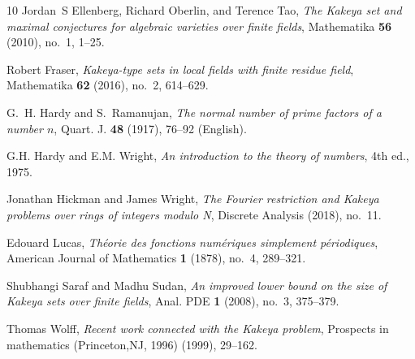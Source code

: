 \documentclass{aic}
\begin{document}
\begin{thebibliography}{10}
Jordan~S Ellenberg, Richard Oberlin, and Terence Tao, \emph{The {K}akeya set
  and maximal conjectures for algebraic varieties over finite fields},
  Mathematika \textbf{56} (2010), no.~1, 1--25.

Robert Fraser, \emph{Kakeya-type sets in local fields with finite residue
  field}, Mathematika \textbf{62} (2016), no.~2, 614--629.

G.~H. {Hardy} and S.~{Ramanujan}, \emph{{The normal number of prime factors of
  a number \(n\)}}, {Quart. J.} \textbf{48} (1917), 76--92 (English).

G.H. {Hardy} and E.M. Wright, \emph{An introduction to the theory of numbers},
  4th ed., 1975.

Jonathan Hickman and James Wright, \emph{The {F}ourier restriction and {K}akeya
  problems over rings of integers modulo {N}}, Discrete Analysis (2018),
  no.~11.

Edouard Lucas, \emph{Théorie des fonctions numériques simplement
  périodiques}, American Journal of Mathematics \textbf{1} (1878), no.~4,
  289--321.

Shubhangi Saraf and Madhu Sudan, \emph{An improved lower bound on the size of
  {K}akeya sets over finite fields}, Anal. PDE \textbf{1} (2008), no.~3,
  375--379.

Thomas Wolff, \emph{Recent work connected with the {K}akeya problem}, Prospects
  in mathematics (Princeton,NJ, 1996) (1999), 29--162.

\end{thebibliography}

%


\end{document}
